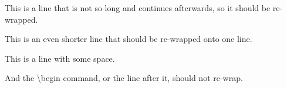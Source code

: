 \documentclass{article}
\begin{document}
This is a line that is not so long
and continues afterwards, so it should be re-wrapped.

This is an even shorter line
that should be re-wrapped onto one line.

This is a line with some space.
\begin{definition}
  And the \textbackslash{}begin command, or the line after it, should
  not re-wrap.
\end{definition}
\end{document}
